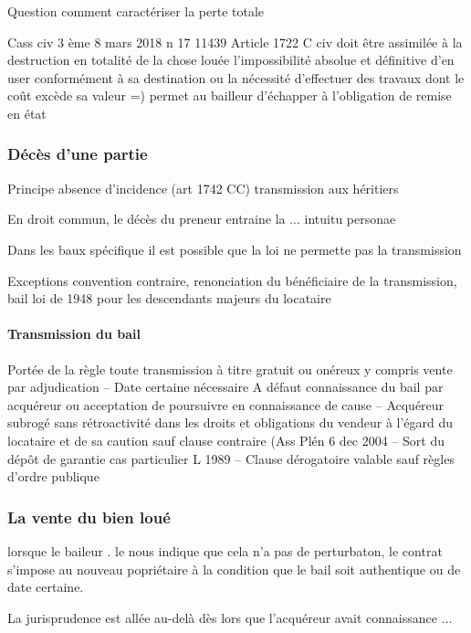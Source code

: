 \documentclass[10pt,a4paper,twoside]{article}
\makeatletter
\newcommand*{\cciv}{\@ifstar{\mbox{C.~civ.}}{Code civil}\xspace}
\newcommand*{\JP}{jurisprudence\xspace}
\newcommand*{\OP}{ordre publique\xspace}
\makeatother
\begin{document}
				Question comment caractériser la perte totale

				Cass civ 3 ème 8 mars 2018 n 17 11439
				Article 1722 C civ doit être assimilée à la
				destruction en totalité de la chose louée
				l’impossibilité absolue et définitive d’en user
				conformément à sa destination ou la nécessité
				d’effectuer des travaux dont le coût excède sa
				valeur
				=)
				permet au bailleur d’échapper à l’obligation de
				remise en état

		\subsubsection{Décès d’une partie}

			Principe absence d’incidence (art 1742 CC)
			transmission aux héritiers

			En droit commun, le décès du preneur entraine la ... intuitu personae

			Dans les baux spécifique il est possible que la loi ne permette pas la transmission

			Exceptions convention contraire, renonciation du
			bénéficiaire de la transmission, bail loi de 1948 pour les
			descendants majeurs du locataire

			\paragraph{Transmission du bail}

				Portée de la règle toute transmission à titre gratuit ou onéreux y
				compris vente par adjudication
				–
				Date certaine nécessaire A défaut connaissance du bail par acquéreur
				ou acceptation de poursuivre en connaissance de cause
				–
				Acquéreur subrogé sans rétroactivité dans les droits et obligations du
				vendeur à l’égard du locataire et de sa caution sauf clause contraire
				(Ass Plén 6 dec 2004
				–
				Sort du dépôt de garantie cas particulier L 1989
				–
				Clause dérogatoire valable sauf règles d’\OP

		\subsubsection{La vente du bien loué}

			lorsque le baileur . le \cciv nous indique que cela n'a pas de perturbaton, le contrat s'impose au nouveau popriétaire à la condition que le bail soit authentique ou de date certaine.

			La \JP est allée au-delà dès lors que l'acquéreur avait connaissance ...
\end{document}
